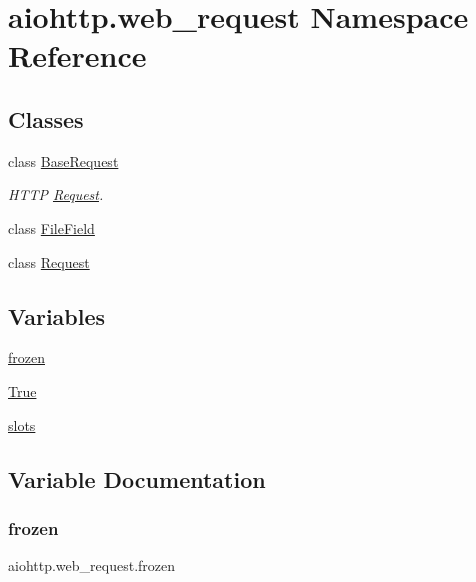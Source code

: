 \hypertarget{namespaceaiohttp_1_1web__request}{}\section{aiohttp.\+web\+\_\+request Namespace Reference}
\label{namespaceaiohttp_1_1web__request}
\subsection*{Classes}
\begin{DoxyCompactItemize}
\item 
class \hyperlink{classaiohttp_1_1web__request_1_1_base_request}{Base\+Request}
\begin{DoxyCompactList}\small\item\em H\+T\+TP \hyperlink{classaiohttp_1_1web__request_1_1_request}{Request}. \end{DoxyCompactList}\item 
class \hyperlink{classaiohttp_1_1web__request_1_1_file_field}{File\+Field}
\item 
class \hyperlink{classaiohttp_1_1web__request_1_1_request}{Request}
\end{DoxyCompactItemize}
\subsection*{Variables}
\begin{DoxyCompactItemize}
\item 
\hyperlink{namespaceaiohttp_1_1web__request_adf714a0463cde802d1e1f2aecdad2840}{frozen}
\item 
\hyperlink{namespaceaiohttp_1_1web__request_a3c2db0f1f89c6a62a7866dfc91dd9005}{True}
\item 
\hyperlink{namespaceaiohttp_1_1web__request_aa10cd66d1e777655fb6496d8c88985d4}{slots}
\end{DoxyCompactItemize}


\subsection{Variable Documentation}
\mbox{\label{namespaceaiohttp_1_1web__request_adf714a0463cde802d1e1f2aecdad2840}} 
\subsubsection{\texorpdfstring{frozen}{frozen}}
{\footnotesize\ttfamily aiohttp.\+web\+\_\+request.\+frozen}

